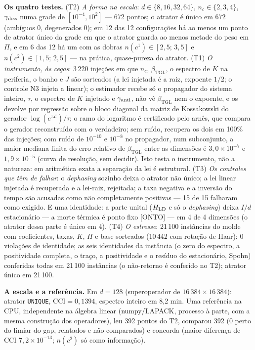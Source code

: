 \documentclass[11pt]{article}
\newcommand{\bTGL}{\beta_{\mathrm{TGL}}}\newcommand{\Msun}{M_{\odot}}\newcommand{\TGL}{\mathrm{TGL}}
\theoremstyle{definition}\newtheorem{deriv}{Derivação}
\begin{document}
\textbf{Os quatro testes.} (T2) \emph{A forma na escala}: $d\in\{8,16,32,64\}$, $n_c\in\{2,3,4\}$, $\gamma_{\rm diss}$ numa grade de $[10^{-4},10^{2}]$ --- 672 pontos; o atrator é único em 672 (ambíguos 0, degenerados 0); em 12 das 12 configurações há ao menos um ponto de atrator único da grade em que o atrator guarda ao menos metade do peso em $\Pi$, e em 6 das 12 há um com as dobras $n(c^1)\in[2{,}5;\,3{,}5]$ e $n(c^2)\in[1{,}5;\,2{,}5]$ --- na prática, quase-pureza do atrator. (T1) \emph{O instrumento, às cegas}: 3\,220 injeções em que $n_c$, $\bTGL$, o espectro de $K$ na periferia, o banho e $J$ são sorteados (a lei injetada é a raiz, expoente $1/2$; o controle N3 injeta a linear); o estimador recebe só o propagador do sistema inteiro, $\tau$, o espectro de $K$ injetado e $\gamma_{\rm anti}$, não vê $\bTGL$ nem o expoente, e os devolve por regressão sobre o bloco diagonal da matriz de Kossakowski do gerador $\log(e^{\tau\mathcal L})/\tau$; o ramo do logaritmo é certificado pelo arnês, que compara o gerador reconstruído com o verdadeiro; sem ruído, recupera os dois em 100\% das injeções; com ruído de $10^{-10}$ e $10^{-8}$ no propagador, num subconjunto, a maior mediana finita do erro relativo de $\bTGL$ entre as dimensões é $3{,}0\times10^{-7}$ e $1{,}9\times10^{-5}$ (curva de resolução, sem decidir). Isto testa o instrumento, não a natureza: em aritmética exata a separação da lei é estrutural. (T3) \emph{Os controles que têm de falhar}: o \emph{dephasing} sozinho deixa o atrator não único; a lei linear injetada é recuperada e a lei-raiz, rejeitada; a taxa negativa e a inversão do tempo são acusadas como não completamente positivas --- 15 de 15 falharam como exigido. E uma identidade: a parte unital ($H_{\rm LD}$ e só o \emph{dephasing}) deixa $I/d$ estacionário --- a morte térmica é ponto fixo \textsf{[ONTO]} --- em 4 de 4 dimensões (o atrator dessa parte é único em 4). (T4) \emph{O estresse}: 21\,100 instâncias do molde com coeficientes, taxas, $K$, $H$ e base sorteados (10\,442 com rotação de Haar): 0 violações de identidade; as seis identidades da instância (o zero do espectro, a positividade completa, o traço, a positividade e o resíduo do estacionário, Spohn) conferidas todas em 21\,100 instâncias (o não-retorno é conferido no T2); atrator único em 21\,100.

\textbf{A escala e a referência.} Em $d=128$ (superoperador de $16\,384\times16\,384$): atrator \texttt{UNIQUE}, $\mathrm{CCI}=0{,}1394$, espectro inteiro em 8{,}2 min. Uma referência na CPU, independente na álgebra linear (numpy/LAPACK, processo à parte, com a mesma construção dos operadores), leu 392 pontos do T2, comparou 392 (0 perto do limiar do gap, relatados e não comparados) e concorda (maior diferença de CCI $7{,}2\times10^{-13}$; $n(c^2)$ só como informação).
\end{document}
